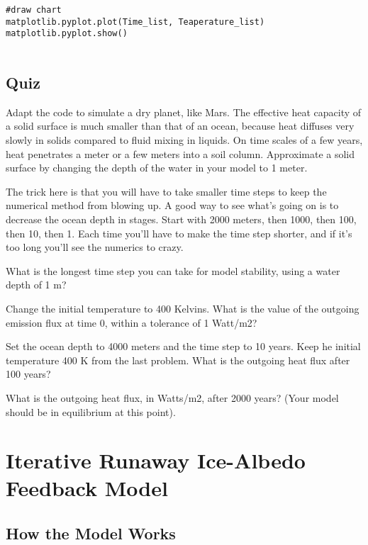 {\begin{code}[흑체 복사평형 온도]
\begin{lstlisting}
#draw chart
matplotlib.pyplot.plot(Time_list, Teaperature_list)
matplotlib.pyplot.show()
	
	\end{lstlisting}
\end{code}

\subsection{Quiz}\index{}
Adapt the code to simulate a dry planet, like Mars. The effective heat capacity of a solid surface is much smaller than that of an ocean, because heat diffuses very slowly in solids compared to fluid mixing in liquids. On time scales of a few years, heat penetrates a meter or a few meters into a soil column. Approximate a solid surface by changing the depth of the water in your model to 1 meter.

The trick here is that you will have to take smaller time steps to keep the numerical method from blowing up. A good way to see what's going on is to decrease the ocean depth in stages. Start with 2000 meters, then 1000, then 100, then 10, then 1. Each time you'll have to make the time step shorter, and if it's too long you'll see the numerics to crazy.

What is the longest time step you can take for model stability, using a water depth of 1 m?



Change the initial temperature to 400 Kelvins. What is the value of the outgoing emission flux at time 0, within a tolerance of 1 Watt/m2?



Set the ocean depth to 4000 meters and the time step to 10 years. Keep he initial temperature 400 K from the last problem. What is the outgoing heat flux after 100 years?



What is the outgoing heat flux, in Watts/m2, after 2000 years? (Your model should be in equilibrium at this point).




\section{Iterative Runaway Ice-Albedo Feedback Model}

\subsection{How the Model Works}\index{}

}
